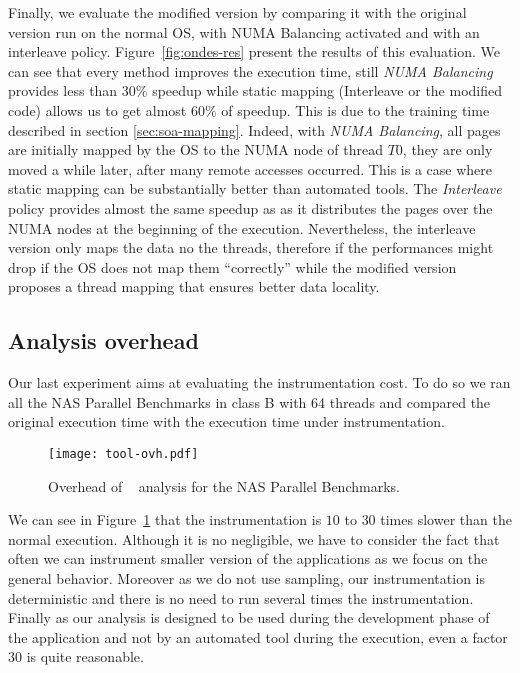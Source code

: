 Finally, we evaluate the modified version by comparing it with the original
version run on the normal OS, with NUMA Balancing activated and with an
interleave policy. Figure~\ref{fig:ondes-res} present the results of this
evaluation. We can see that every method improves the execution time, still
\emph{NUMA Balancing} provides less than $30\%$ speedup while static mapping
(Interleave or the modified code) allows us to get almost $60\%$ of speedup. This is
due to the training time described in section \ref{sec:soa-mapping}. Indeed,
with \emph{NUMA Balancing}, all pages are initially mapped by the OS to the NUMA node of thread $T0$, they
are only moved a while later, after many remote accesses occurred. This is a case where static mapping can be substantially better than automated
tools. The \emph{Interleave} policy provides almost the same speedup as
\TABARNAC as it distributes the pages over the NUMA nodes at the beginning of
the execution. Nevertheless, the interleave version only maps the data no the
threads, therefore if the performances might drop if the OS does not map them
``correctly'' while the modified version proposes a thread mapping that ensures better
data locality.

\subsection{Analysis overhead}
\label{sec:expe-overhead}

Our last experiment aims at evaluating the instrumentation cost. To do so we
ran all the NAS Parallel Benchmarks in class B with 64 threads and compared
the original execution time with the execution time under instrumentation.

\begin{figure}[htb]
    \centering
    \texttt{[image: tool-ovh.pdf]}
    \caption{Overhead of \TABARNAC~ analysis for the NAS Parallel Benchmarks.}
    \label{fig:ovh}
\end{figure}


We can see in Figure~\ref{fig:ovh} that
the instrumentation is $10$ to $30$ times slower than the normal execution. Although it is
no negligible, we have to consider the fact that often we can instrument
smaller version of the applications as we focus on the general behavior.
Moreover as we do not use sampling, our instrumentation is deterministic and
there is no need to run several times the instrumentation. Finally as our
analysis is designed to be used during the development phase of the
application and not by an automated tool during the execution, even a factor $30$
is quite reasonable.
